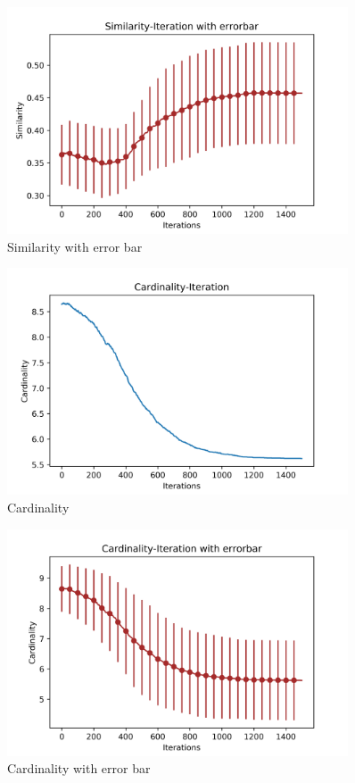 \documentclass[a4paper,12pt]{article}
\begin{document}
%
\begin{figure}[H]
	\centering
	\includegraphics[width=0.9\textwidth]{SimErr50_4_1500_50_8}
	\caption{Similarity with error bar}\label{SimErr50_4_1500_50_8_mh}
\end{figure}
%
\begin{figure}[H]
	\centering
	\includegraphics[width=0.9\textwidth]{Card50_4_1500_50_8}
	\caption{Cardinality}\label{Card50_4_1500_50_8_mh}
\end{figure}
%
\begin{figure}[H]
	\centering
	\includegraphics[width=0.9\textwidth]{CardErr50_4_1500_50_8}
	\caption{Cardinality with error bar}\label{CardErr50_4_1500_50_8_mh}
\end{figure}
\end{document}
